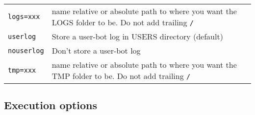 \documentclass[]{article}
\begin{document}
\begin{longtable}[]{@{}ll@{}}
\begin{minipage}[t]{0.16\columnwidth}\raggedright\strut
\texttt{logs=xxx}\strut
\end{minipage} & \begin{minipage}[t]{0.78\columnwidth}\raggedright\strut
name relative or absolute path to where you want the LOGS folder to be.
Do not add trailing \texttt{/}\strut
\end{minipage}\tabularnewline
\begin{minipage}[t]{0.16\columnwidth}\raggedright\strut
\texttt{userlog}\strut
\end{minipage} & \begin{minipage}[t]{0.78\columnwidth}\raggedright\strut
Store a user-bot log in USERS directory (default)\strut
\end{minipage}\tabularnewline
\begin{minipage}[t]{0.16\columnwidth}\raggedright\strut
\texttt{nouserlog}\strut
\end{minipage} & \begin{minipage}[t]{0.78\columnwidth}\raggedright\strut
Don't store a user-bot log\strut
\end{minipage}\tabularnewline
\begin{minipage}[t]{0.16\columnwidth}\raggedright\strut
\texttt{tmp=xxx}\strut
\end{minipage} & \begin{minipage}[t]{0.78\columnwidth}\raggedright\strut
name relative or absolute path to where you want the TMP folder to be.
Do not add trailing \texttt{/}\strut
\end{minipage}\tabularnewline
\bottomrule
\end{longtable}

\subsection{Execution options}\label{execution-options}
\end{document}
